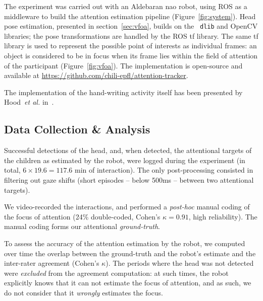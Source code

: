 \documentclass{sig-alternate}
\newcommand{\etal}{\textit{et al.}\xspace}
\begin{document}
The experiment was carried out with an Aldebaran {\sc nao} robot, using ROS as a
middleware to build the attention estimation pipeline (Figure~\ref{fig:system}).
Head pose estimation, presented in section~\ref{sec:vfoa}, builds on the {\tt
dlib} and OpenCV libraries; the pose transformations are handled by the ROS {\sc
tf} library. The same {\sc tf} library is used to represent the possible point
of interests as individual frames: an object is considered to be in focus when
its frame lies within the field of attention of the participant
(Figure~\ref{fig:vfoa}).  The implementation is open-source and available at
\url{https://github.com/chili-epfl/attention-tracker}.

The implementation of the hand-writing activity itself has been presented by
Hood~\etal in~\cite{Hood:2015}.

\subsection{Data Collection \& Analysis}

Successful detections of the head, and, when detected, the attentional targets
of the children as estimated by the robot, were logged during the experiment (in
total, $6\times19.6=117.6$ min of interaction). The only post-processing
consisted in filtering out gaze shifts (short episodes -- below 500ms -- between
two attentional targets).

We video-recorded the interactions, and performed a {\it post-hoc} manual coding
of the focus of attention (24\% double-coded, Cohen's $\kappa=0.91$, high
reliability).  The manual coding forms our attentional \emph{ground-truth}.

To assess the accuracy of the attention estimation by the robot, we computed
over time the overlap between the ground-truth and the robot's estimate and the
inter-rater agreement (Cohen's $\kappa$). The periods where the head was not
detected were \emph{excluded} from the agreement computation: at such times, the
robot explicitly knows that it can not estimate the focus of attention, and as
such, we do not consider that it \emph{wrongly} estimates the focus.


\end{document}
